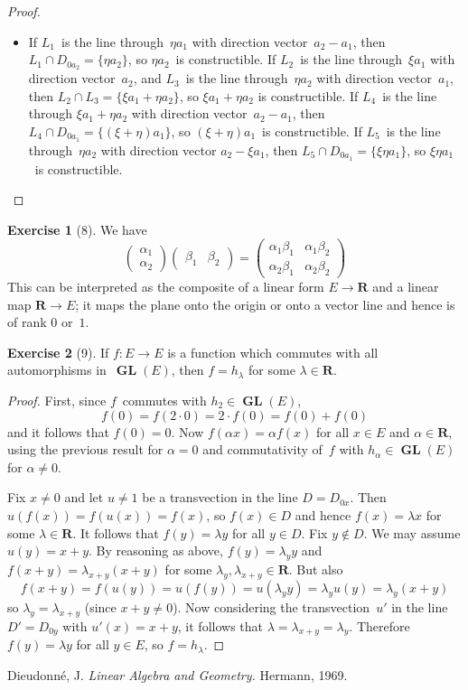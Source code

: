 \documentclass[letterpaper,12pt]{article}
\newcommand{\R}{\mathbf{R}}
\newcommand{\sect}{\cap}
\newcommand{\mult}{\cdot}
\DeclareMathOperator{\GL}{\mathbf{GL}}
\theoremstyle{definition}
\newtheorem*{exer}{Exercise}
\theoremstyle{remark}
\begin{document}
\begin{proof}
\begin{itemize}[itemsep=0pt]
\item If \(L_1\)~is the line through~\(\eta a_1\) with direction vector~\(a_2-a_1\), then \(L_1\sect D_{0a_2}=\{\eta a_2\}\), so \(\eta a_2\)~is constructible. If \(L_2\)~is the line through~\(\xi a_1\) with direction vector~\(a_2\), and \(L_3\)~is the line through~\(\eta a_2\) with direction vector~\(a_1\), then \(L_2\sect L_3=\{\xi a_1+\eta a_2\}\), so \(\xi a_1+\eta a_2\) is constructible. If \(L_4\)~is the line through \(\xi a_1+\eta a_2\) with direction vector~\(a_2-a_1\), then \(L_4\sect D_{0a_1}=\{(\xi+\eta)a_1\}\), so \((\xi+\eta)a_1\)~is constructible. If \(L_5\)~is the line through~\(\eta a_2\) with direction vector \(a_2-\xi a_1\), then \(L_5\sect D_{0a_1}=\{\xi\eta a_1\}\), so \(\xi\eta a_1\)~is constructible.

\end{itemize}
\end{proof}

\begin{exer}[8]
We have
\[\begin{pmatrix}
\alpha_1\\
\alpha_2
\end{pmatrix}
\begin{pmatrix}
\beta_1&\beta_2
\end{pmatrix}
=
\begin{pmatrix}
\alpha_1\beta_1&\alpha_1\beta_2\\
\alpha_2\beta_1&\alpha_2\beta_2
\end{pmatrix}\]
This can be interpreted as the composite of a linear form \(E\to\R\) and a linear map \(\R\to E\); it maps the plane onto the origin or onto a vector line and hence is of rank \(0\) or~\(1\).
\end{exer}

\begin{exer}[9]
If \(f:E\to E\) is a function which commutes with all automorphisms in~\(\GL(E)\), then \(f=h_{\lambda}\) for some \(\lambda\in\R\).
\end{exer}
\begin{proof}
First, since \(f\)~commutes with \(h_2\in\GL(E)\),
\[f(0)=f(2\mult 0)=2\mult f(0)=f(0)+f(0)\]
and it follows that \(f(0)=0\). Now \(f(\alpha x)=\alpha f(x)\) for all \(x\in E\) and \(\alpha\in\R\), using the previous result for \(\alpha=0\) and commutativity of~\(f\) with \(h_{\alpha}\in\GL(E)\) for \(\alpha\ne0\).

Fix \(x\ne 0\) and let \(u\ne 1\) be a transvection in the line \(D=D_{0x}\). Then \(u(f(x))=f(u(x))=f(x)\), so \(f(x)\in D\) and hence \(f(x)=\lambda x\) for some \(\lambda\in\R\). It follows that \(f(y)=\lambda y\) for all \(y\in D\). Fix \(y\not\in D\). We may assume \(u(y)=x+y\). By reasoning as above, \(f(y)=\lambda_y y\) and \(f(x+y)=\lambda_{x+y}(x+y)\) for some \(\lambda_y,\lambda_{x+y}\in\R\). But also
\[f(x+y)=f(u(y))=u(f(y))=u(\lambda_y y)=\lambda_y u(y)=\lambda_y(x+y)\]
so \(\lambda_y=\lambda_{x+y}\) (since \(x+y\ne 0\)). Now considering the transvection~\(u'\) in the line \(D'=D_{0y}\) with \(u'(x)=x+y\), it follows that \(\lambda=\lambda_{x+y}=\lambda_y\). Therefore \(f(y)=\lambda y\) for all \(y\in E\), so \(f=h_{\lambda}\).
\end{proof}

\begin{thebibliography}{0}
 Dieudonn\'e, J. \textit{Linear Algebra and Geometry.} Hermann, 1969.
\end{thebibliography}
\end{document}
